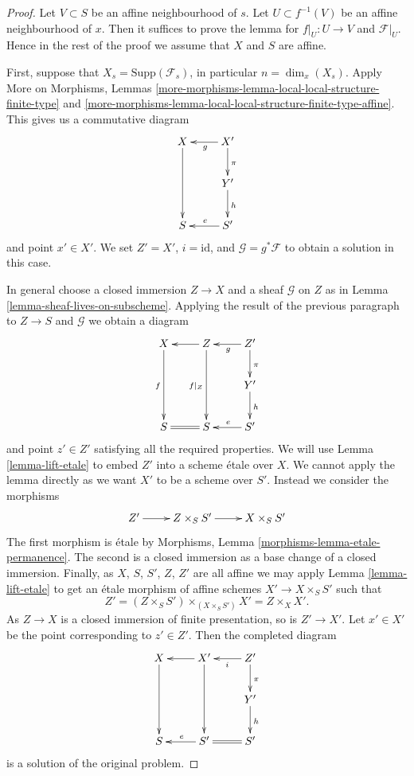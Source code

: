 \documentclass[10pt,a4paper]{amsart}
\theoremstyle{plain}
\theoremstyle{definition}
\theoremstyle{remark}
\numberwithin{equation}{subsection}
\begin{document}
\begin{proof}
Let $V \subset S$ be an affine neighbourhood of $s$.
Let $U \subset f^{-1}(V)$ be an affine neighbourhood of $x$.
Then it suffices to prove the lemma for $f|_U : U \to V$ and
$\mathcal{F}|_U$. Hence in the rest of the proof we assume that
$X$ and $S$ are affine.

\medskip\noindent
First, suppose that $X_s = \text{Supp}(\mathcal{F}_s)$, in particular
$n = \dim_x(X_s)$. Apply
More on Morphisms,
Lemmas \ref{more-morphisms-lemma-local-local-structure-finite-type} and
\ref{more-morphisms-lemma-local-local-structure-finite-type-affine}.
This gives us a commutative diagram
$$
\xymatrix{
X \ar[dd] & X' \ar[l]^g \ar[d]^\pi \\
& Y' \ar[d]^h  \\
S & S' \ar[l]_e
}
$$
and point $x' \in X'$. We set $Z' = X'$, $i = \text{id}$, and
$\mathcal{G} = g^*\mathcal{F}$ to obtain a solution in this case.

\medskip\noindent
In general choose a closed immersion $Z \to X$ and a sheaf
$\mathcal{G}$ on $Z$ as in
Lemma \ref{lemma-sheaf-lives-on-subscheme}.
Applying the result of the previous paragraph to $Z \to S$ and
$\mathcal{G}$ we obtain a diagram
$$
\xymatrix{
X \ar[dd]_f & Z \ar[l] \ar[dd]_{f|_Z} & Z' \ar[l]^g \ar[d]^\pi \\
& & Y' \ar[d]^h \\
S & S \ar@{=}[l] & S' \ar[l]_e
}
$$
and point $z' \in Z'$ satisfying all the required properties.
We will use
Lemma \ref{lemma-lift-etale}
to embed $Z'$ into a scheme \'etale over $X$. We cannot apply the lemma directly
as we want $X'$ to be a scheme over $S'$. Instead we
consider the morphisms
$$
\xymatrix{
Z' \ar[r] & Z \times_S S' \ar[r] & X \times_S S'
}
$$
The first morphism is \'etale by
Morphisms, Lemma \ref{morphisms-lemma-etale-permanence}.
The second is a closed immersion as a base change of a closed immersion.
Finally, as $X$, $S$, $S'$, $Z$, $Z'$ are all affine we may apply
Lemma \ref{lemma-lift-etale}
to get an \'etale morphism of affine schemes $X' \to X \times_S S'$ such that
$$
Z' = (Z \times_S S') \times_{(X \times_S S')} X' = Z \times_X X'.
$$
As $Z \to X$ is a closed immersion of finite presentation, so is $Z' \to X'$.
Let $x' \in X'$ be the point corresponding to $z' \in Z'$.
Then the completed diagram
$$
\xymatrix{
X \ar[dd] & X' \ar[dd] \ar[l] & Z' \ar[l]^i \ar[d]^\pi \\
& & Y' \ar[d]^h \\
S & S' \ar[l]_e & S' \ar@{=}[l]
}
$$
is a solution of the original problem.
\end{proof}
\end{document}
